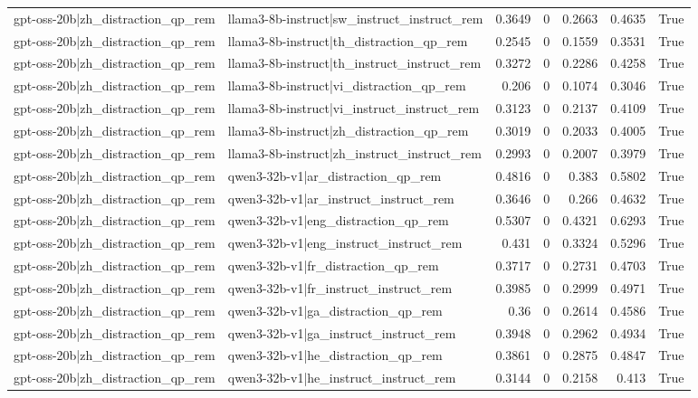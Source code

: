 \begin{table}
\begin{tabular}{l l r r r r l}
gpt-oss-20b|zh_distraction_qp_rem & llama3-8b-instruct|sw_instruct_instruct_rem & 0.3649 & 0 & 0.2663 & 0.4635 & True \\
gpt-oss-20b|zh_distraction_qp_rem & llama3-8b-instruct|th_distraction_qp_rem & 0.2545 & 0 & 0.1559 & 0.3531 & True \\
gpt-oss-20b|zh_distraction_qp_rem & llama3-8b-instruct|th_instruct_instruct_rem & 0.3272 & 0 & 0.2286 & 0.4258 & True \\
gpt-oss-20b|zh_distraction_qp_rem & llama3-8b-instruct|vi_distraction_qp_rem & 0.206 & 0 & 0.1074 & 0.3046 & True \\
gpt-oss-20b|zh_distraction_qp_rem & llama3-8b-instruct|vi_instruct_instruct_rem & 0.3123 & 0 & 0.2137 & 0.4109 & True \\
gpt-oss-20b|zh_distraction_qp_rem & llama3-8b-instruct|zh_distraction_qp_rem & 0.3019 & 0 & 0.2033 & 0.4005 & True \\
gpt-oss-20b|zh_distraction_qp_rem & llama3-8b-instruct|zh_instruct_instruct_rem & 0.2993 & 0 & 0.2007 & 0.3979 & True \\
gpt-oss-20b|zh_distraction_qp_rem & qwen3-32b-v1|ar_distraction_qp_rem & 0.4816 & 0 & 0.383 & 0.5802 & True \\
gpt-oss-20b|zh_distraction_qp_rem & qwen3-32b-v1|ar_instruct_instruct_rem & 0.3646 & 0 & 0.266 & 0.4632 & True \\
gpt-oss-20b|zh_distraction_qp_rem & qwen3-32b-v1|eng_distraction_qp_rem & 0.5307 & 0 & 0.4321 & 0.6293 & True \\
gpt-oss-20b|zh_distraction_qp_rem & qwen3-32b-v1|eng_instruct_instruct_rem & 0.431 & 0 & 0.3324 & 0.5296 & True \\
gpt-oss-20b|zh_distraction_qp_rem & qwen3-32b-v1|fr_distraction_qp_rem & 0.3717 & 0 & 0.2731 & 0.4703 & True \\
gpt-oss-20b|zh_distraction_qp_rem & qwen3-32b-v1|fr_instruct_instruct_rem & 0.3985 & 0 & 0.2999 & 0.4971 & True \\
gpt-oss-20b|zh_distraction_qp_rem & qwen3-32b-v1|ga_distraction_qp_rem & 0.36 & 0 & 0.2614 & 0.4586 & True \\
gpt-oss-20b|zh_distraction_qp_rem & qwen3-32b-v1|ga_instruct_instruct_rem & 0.3948 & 0 & 0.2962 & 0.4934 & True \\
gpt-oss-20b|zh_distraction_qp_rem & qwen3-32b-v1|he_distraction_qp_rem & 0.3861 & 0 & 0.2875 & 0.4847 & True \\
gpt-oss-20b|zh_distraction_qp_rem & qwen3-32b-v1|he_instruct_instruct_rem & 0.3144 & 0 & 0.2158 & 0.413 & True \\

\end{tabular}
\end{table}
